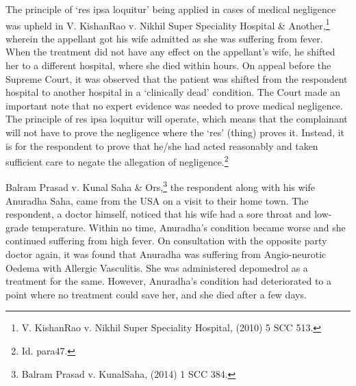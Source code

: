 \begin{multicols}{2}
\vspace{.15cm}


\vspace{.1cm}

\noi
The principle of ‘res ipsa loquitur’ being applied in cases of medical negligence was upheld in V.
KishanRao v. Nikhil Super Speciality Hospital \& Another,\footnote{V. KishanRao v. Nikhil Super Speciality Hospital, (2010) 5 SCC 513.} wherein the appellant got his wife
admitted as she was suffering from fever. When the treatment did not have any effect on the
appellant’s wife, he shifted her to a different hospital, where she died within hours. On appeal
before the Supreme Court, it was observed that the patient was shifted from the respondent
hospital to another hospital in a ‘clinically dead’ condition. The Court made an important note
that no expert evidence was needed to prove medical negligence. The principle of res ipsa loquitur
will operate, which means that the complainant will not have to prove the negligence where the
‘res’ (thing) proves it. Instead, it is for the respondent to prove that he/she had acted reasonably
and taken sufficient care to negate the allegation of negligence.\footnote{Id. para47.}

\vspace{-.15cm}


\vspace{-.1cm}

\noi
Balram Prasad v. Kunal Saha \& Ors,\footnote{Balram Prasad v. KunalSaha, (2014) 1 SCC 384.} the respondent along with his wife Anuradha Saha, came
from the USA on a visit to their home town. The respondent, a doctor himself, noticed that his
wife had a sore throat and low-grade temperature. Within no time, Anuradha’s condition became
worse and she continued suffering from high fever. On consultation with the opposite party doctor
again, it was found that Anuradha was suffering from Angio-neurotic Oedema with Allergic
Vasculitis. She was administered depomedrol as a treatment for the same. However, Anuradha’s
condition had deteriorated to a point where no treatment could save her, and she died after a few
days.


\end{multicols}
